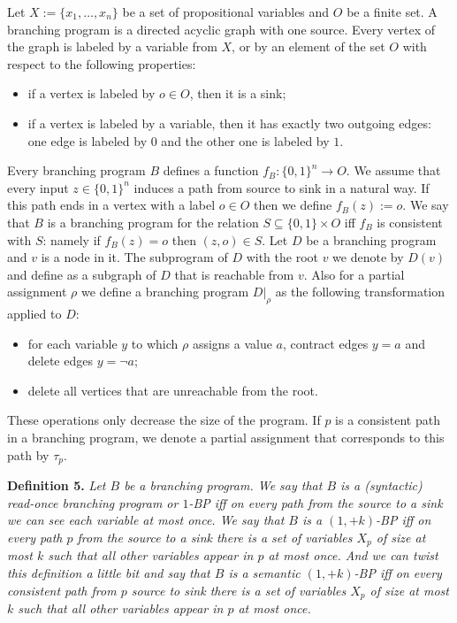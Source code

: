 \documentclass[10pt,a4paper]{article}
\newenvironment{result}[1]{\par\medskip\noindent\textbf{#1.}\itshape}{\par\medskip}
\begin{document}
Let $X:=\{x_1,\ldots,x_n\}$ be a set of propositional variables and $O$ be a finite set. A branching program is a directed acyclic graph with one source. Every vertex of the graph is labeled by a variable from $X$, or by an element of the set $O$ with respect to the following properties:
\begin{itemize}\item if a vertex is labeled by $o\in O$, then it is a sink;
\item if a vertex is labeled by a variable, then it has exactly two outgoing edges: one edge is labeled by $0$ and the other one is labeled by $1$.\end{itemize}
Every branching program $B$ defines a function $f_B:\{0,1\}^n\to O$. We assume that every input $z\in\{0,1\}^n$ induces a path from source to sink in a natural way. If this path ends in a vertex with a label $o\in O$ then we define $f_B(z):=o$.
We say that $B$ is a branching program for the relation $S\subseteq\{0,1\}\times O$ iff $f_B$ is consistent with $S$: namely if $f_B(z)=o$ then $(z,o)\in S$.
Let $D$ be a branching program and $v$ is a node in it. The subprogram of $D$ with the root $v$ we denote by $D(v)$ and define as a subgraph of $D$ that is reachable from $v$. Also for a partial assignment $\rho$ we define a branching program $D|_\rho$ as the following transformation applied to $D$:
\begin{itemize}\item for each variable $y$ to which $\rho$ assigns a value $a$, contract edges $y=a$ and delete edges $y=\neg a$;
\item delete all vertices that are unreachable from the root.\end{itemize}
These operations only decrease the size of the program.
If $p$ is a consistent path in a branching program, we denote a partial assignment that corresponds to this path by $\tau_p$.
\begin{result}{Definition 5}
Let $B$ be a branching program. We say that $B$ is a (syntactic) read-once branching program or $1$-BP iff on every path from the source to a sink we can see each variable at most once.
We say that $B$ is a $(1,+k)$-BP iff on every path $p$ from the source to a sink there is a set of variables $X_p$ of size at most $k$ such that all other variables appear in $p$ at most once.
And we can twist this definition a little bit and say that $B$ is a semantic $(1,+k)$-BP iff on every consistent path from $p$ source to sink there is a set of variables $X_p$ of size at most $k$ such that all other variables appear in $p$ at most once.
\end{result}
\end{document}
